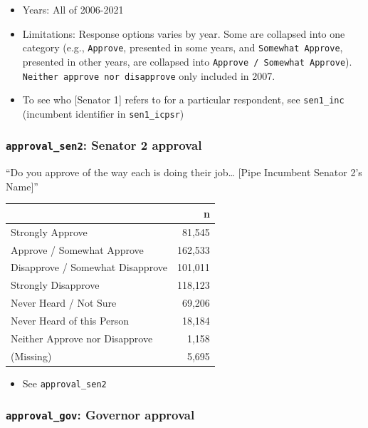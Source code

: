 \documentclass[10pt,article,oneside]{memoir}
\theoremstyle{definition}
\begin{document}
\begin{itemize}
\tightlist
\item
  Years: All of 2006-2021
\item
  Limitations: Response options varies by year. Some are collapsed into
  one category (e.g., \texttt{Approve}, presented in some years, and
  \texttt{Somewhat\ Approve}, presented in other years, are collapsed
  into \texttt{Approve\ /\ Somewhat\ Approve}).
  \texttt{Neither\ approve\ nor\ disapprove} only included in 2007.
\item
  To see who {[}Senator 1{]} refers to for a particular respondent, see
  \texttt{sen1\_inc} (incumbent identifier in \texttt{sen1\_icpsr})
\end{itemize}

\hypertarget{approval_sen2-senator-2-approval}{%
\subsubsection{\texorpdfstring{\texttt{approval\_sen2}: Senator 2
approval}{approval\_sen2: Senator 2 approval}}\label{approval_sen2-senator-2-approval}}

``Do you approve of the way each is doing their job\ldots{} {[}Pipe
Incumbent Senator 2's Name{]}''

\begin{table}[H]
\centering
\begin{tabular}[t]{lr}
\toprule
 & n\\
\midrule
Strongly Approve & 81,545\\
Approve / Somewhat Approve & 162,533\\
Disapprove / Somewhat Disapprove & 101,011\\
Strongly Disapprove & 118,123\\
Never Heard / Not Sure & 69,206\\
Never Heard of this Person & 18,184\\
Neither Approve nor Disapprove & 1,158\\
(Missing) & 5,695\\
\bottomrule
\end{tabular}
\end{table}

\begin{itemize}
\tightlist
\item
  See \texttt{approval\_sen2}
\end{itemize}

\hypertarget{approval_gov-governor-approval}{%
\subsubsection{\texorpdfstring{\texttt{approval\_gov}: Governor
approval}{approval\_gov: Governor approval}}\label{approval_gov-governor-approval}}
\end{document}
